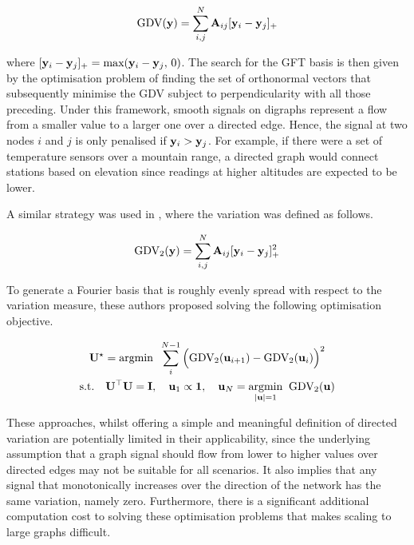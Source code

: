 \begin{equation}
    \text{GDV}(\mathbf{y}) = \sum_{i,j}^N \mathbf{A}_{ij} [\mathbf{y}_i - \mathbf{y}_j]_{+}
\end{equation}

where $[\mathbf{y}_i - \mathbf{y}_j]_{+} = \text{max}(\mathbf{y}_i - \mathbf{y}_j, \, 0)$. The search for the GFT basis is then given by the optimisation problem of finding the set of orthonormal vectors that subsequently minimise the GDV subject to perpendicularity with all those preceding. Under this framework, smooth signals on digraphs represent a flow from a smaller value to a larger one over a directed edge. Hence, the signal at two nodes $i$ and $j$ is only penalised if $\mathbf{y}_i > \mathbf{y}_j$. For example, if there were a set of temperature sensors over a mountain range, a directed graph would connect stations based on elevation since readings at higher altitudes are expected to be lower. 

A similar strategy was used in \cite{Shafipour2019}, where the variation was defined as follows.  

\begin{equation}
    \text{GDV}_2(\mathbf{y}) = \sum_{i,j}^N \mathbf{A}_{ij} [\mathbf{y}_i - \mathbf{y}_j]_{+}^2
\end{equation}

To generate a Fourier basis that is roughly evenly spread with respect to the variation measure, these authors proposed solving the following optimisation objective. 

\begin{equation}
    \begin{gathered}
    \mathbf{U}^{\star} = \text{argmin} \;\; \sum_{i}^{N-1} \Big(\text{GDV}_2(\mathbf{u}_{i+1}) - \text{GDV}_2(\mathbf{u}_i)\Big)^2 \\
    \text{s.t.} \quad \mathbf{U}^\top\mathbf{U} = \mathbf{I}, \quad \mathbf{u}_1 \propto \mathbf{1}, \quad \mathbf{u}_N = \underset{|\mathbf{u}| = 1}{\text{argmin} } \;\; \text{GDV}_2(\mathbf{u})
    \end{gathered}
\end{equation}

These approaches, whilst offering a simple and meaningful definition of directed variation are potentially limited in their applicability, since the underlying assumption that a graph signal should flow from lower to higher values over directed edges may not be suitable for all scenarios. It also implies that any signal that monotonically increases over the direction of the network has the same variation, namely zero. Furthermore, there is a significant additional computation cost to solving these optimisation problems that makes scaling to large graphs difficult. 

